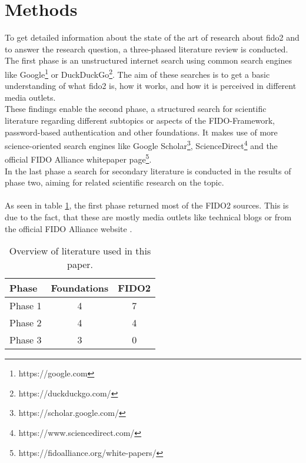 
\section{Methods}
\label{sec:methods}


To get detailed information about the state of the art of research about \ac{fido2} and to answer the research question, a three-phased literature review is conducted.\\
The first phase is an unstructured internet search using common search engines like Google\footnote{https://google.com} or DuckDuckGo\footnote{https://duckduckgo.com/}. The aim of these searches is to get a basic understanding of what \ac{fido2} is, how it works, and how it is perceived in different media outlets.\\
These findings enable the second phase, a structured search for scientific literature regarding different subtopics or aspects of the FIDO-Framework, password-based authentication and other foundations. It makes use of more science-oriented search engines like Google Scholar\footnote{https://scholar.google.com/}, ScienceDirect\footnote{https://www.sciencedirect.com/} and the official FIDO Alliance whitepaper page\footnote{https://fidoalliance.org/white-papers/}.\\
In the last phase a search for secondary literature is conducted in the results of phase two, aiming for related scientific research on the topic.\\
\\
As seen in table \ref{tab:literature_review}, the first phase returned most of the FIDO2 sources. This is due to the fact, that these are mostly media outlets like technical blogs \citep{hunt2018b,leitner2019, chonng2018, ng2019, mingis2020} or from the official FIDO Alliance website \citep{fido2_overview,fido2_webauthn}.

\begin{table}[ht]
    \centering
    \caption{Overview of literature used in this paper.}
    \label{tab:literature_review}
    \begin{tabular}{ l | c | c }
        \textbf{Phase} & \textbf{Foundations} & \textbf{FIDO2}\\
        \hline
        Phase 1 & 4 & 7\\
        Phase 2 & 4 & 4\\
        Phase 3 & 3 & 0\\
    \end{tabular}
\end{table}